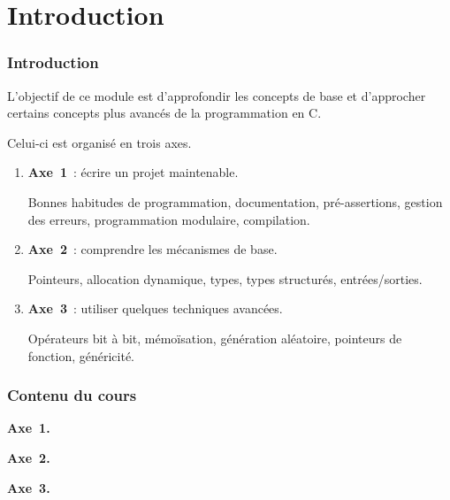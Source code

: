 
\section*{Introduction}

\begin{frame} \frametitle{Introduction}
L'objectif de ce module est d'approfondir les concepts de base et 
d'approcher certains concepts plus avancés de la programmation en {\sf C}.
\bigskip

Celui-ci est organisé en trois axes.
\medskip

\begin{enumerate}
    \item {\bf Axe~1}~: \alert{écrire un projet maintenable}.
    \medskip
    
    Bonnes habitudes de programmation, documentation, pré-assertions,
    gestion des erreurs, programmation modulaire, compilation.
    \bigskip
    
    \item {\bf Axe~2}~: \alert{comprendre les mécanismes de base}.
    \medskip
    
    Pointeurs, allocation dynamique, types, types structurés, entrées/sorties.
    \bigskip
    
    \item {\bf Axe~3}~: \alert{utiliser quelques techniques avancées}.
    \medskip
    
    Opérateurs bit à bit, mémoïsation, génération aléatoire, pointeurs
    de fonction, généricité.
\end{enumerate}
\end{frame}

\begin{frame} \frametitle{Contenu du cours}
\begin{multicols}{3}
    \begin{footnotesize}
        {\large \bf Axe~1.}
        \smallskip
        
        \tableofcontents[hideallsubsections,part=1]
        \bigskip

        {\large \bf Axe~2.}
        \smallskip
        
        \tableofcontents[hideallsubsections,part=2]
        \bigskip
        
        {\large \bf Axe~3.}
        \smallskip
        
        \tableofcontents[hideallsubsections,part=3]
    \end{footnotesize}
\end{multicols}
\end{frame}

